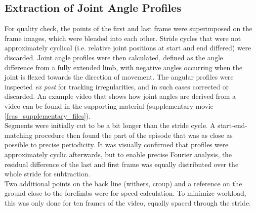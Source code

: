 \subsection{Extraction of Joint Angle Profiles}\label{apdx:digitization}
For quality check, the  points of the first and last frame were superimposed on the frame images, which were blended into each other.
Stride cycles that were not approximately cyclical (i.e. relative joint positions at start and end differed) were discarded.
Joint angle profiles were then calculated, defined as the  angle difference from a fully extended limb, with negative  angles occurring when the joint is flexed towards the direction of movement.
The angular profiles were inspected \textit{ex post} for tracking irregularities, and in such cases corrected or discarded.
An example video that shows how joint angles are derived from a video can be found in the supporting material (supplementary movie \ref{fcas_supplementary_files}).
\\Segments were initially cut to be a bit longer than the stride cycle.
A start-end-matching procedure then found the part of the episode that was as close as possible to precise periodicity.
It was visually confirmed that profiles were approximately cyclic afterwards, but to enable precise Fourier analysis, the residual difference of the last and first frame was equally distributed over the whole stride for subtraction.
\\Two additional points on the back line (withers, croup) and a reference on the ground close to the forelimbs were  for speed calculation.
To minimize workload, this was only done for ten frames of the video, equally spaced through the stride.


\clearpage
